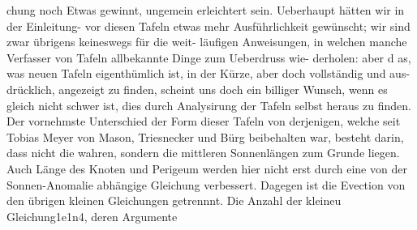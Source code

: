 \documentclass[12pt,a4paper]{article}
\begin{document}
chung noch Etwas gewinnt, ungemein erleichtert sein. Ueberhaupt hätten wir in der Einleitung- vor\newline
diesen Tafeln etwas mehr Ausführlichkeit gewünscht; wir sind zwar übrigens keineswegs für die weit-\newline
läufigen Anweisungen, in welchen manche Verfasser von Tafeln allbekannte Dinge zum Ueberdruss wie-\newline
derholen: aber d as, was neuen Tafeln eigenthümlich ist, in der Kürze, aber doch vollständig und aus-\newline
drücklich, angezeigt zu finden, scheint uns doch ein billiger Wunsch, wenn es gleich nicht schwer ist,\newline
dies durch Analysirung der Tafeln selbst heraus zu finden.\newline
Der vornehmste Unterschied der Form dieser Tafeln von derjenigen, welche seit Tobias Meyer\newline
von Mason, Triesnecker und Bürg beibehalten war, besteht darin, dass nicht die wahren, sondern die\newline
mittleren Sonnenlängen zum Grunde liegen. Auch Länge des Knoten und Perigeum werden hier nicht\newline
erst durch eine von der Sonnen-Anomalie abhängige Gleichung verbessert. Dagegen ist die Evection\newline
von den übrigen kleinen Gleichungen getrennnt. Die Anzahl der kleineu Gleichung1e1n4, deren Argumente\newline
\end{document}
